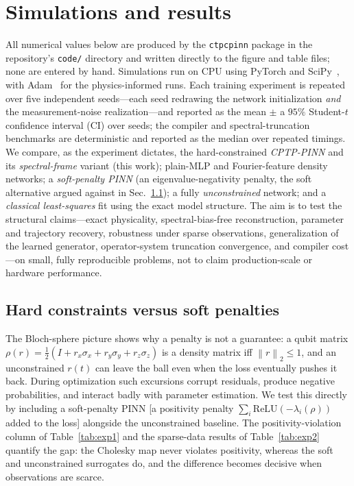 \documentclass[twocolumn,aps,prxquantum,superscriptaddress,nofootinbib,floatfix,longbibliography]{revtex4-2}
\newcommand{\norm}[1]{\left\lVert #1 \right\rVert}
\begin{document}
\section{Simulations and results}
\label{sec:results}

All numerical values below are produced by the \texttt{ctpcpinn} package in the repository's \texttt{code/} directory and written directly to the figure and table files; none are entered by hand. Simulations run on CPU using PyTorch and SciPy~\cite{paszke2019pytorch,virtanen2020scipy}, with Adam~\cite{kingma2015adam} for the physics-informed runs. Each training experiment is repeated over five independent seeds---each seed redrawing the network initialization \emph{and} the measurement-noise realization---and reported as the mean $\pm$ a $95\%$ Student-$t$ confidence interval (CI) over seeds; the compiler and spectral-truncation benchmarks are deterministic and reported as the median over repeated timings. We compare, as the experiment dictates, the hard-constrained \emph{CPTP-PINN} and its \emph{spectral-frame} variant (this work); plain-MLP and Fourier-feature density networks; a \emph{soft-penalty PINN} (an eigenvalue-negativity penalty, the soft alternative argued against in Sec.~\ref{sec:soft_penalties_results}); a fully \emph{unconstrained} network; and a \emph{classical least-squares} fit using the exact model structure. The aim is to test the structural claims---exact physicality, spectral-bias-free reconstruction, parameter and trajectory recovery, robustness under sparse observations, generalization of the learned generator, operator-system truncation convergence, and compiler cost---on small, fully reproducible problems, not to claim production-scale or hardware performance.

\subsection{Hard constraints versus soft penalties}
\label{sec:soft_penalties_results}

The Bloch-sphere picture shows why a penalty is not a guarantee: a qubit matrix $\rho(r)=\tfrac12(I+r_x\sigma_x+r_y\sigma_y+r_z\sigma_z)$ is a density matrix iff $\norm{r}_2\le1$, and an unconstrained $r(t)$ can leave the ball even when the loss eventually pushes it back. During optimization such excursions corrupt residuals, produce negative probabilities, and interact badly with parameter estimation. We test this directly by including a soft-penalty PINN [a positivity penalty $\sum_i\mathrm{ReLU}(-\lambda_i(\rho))$ added to the loss] alongside the unconstrained baseline. The positivity-violation column of Table~\ref{tab:exp1} and the sparse-data results of Table~\ref{tab:exp2} quantify the gap: the Cholesky map never violates positivity, whereas the soft and unconstrained surrogates do, and the difference becomes decisive when observations are scarce.
\end{document}
